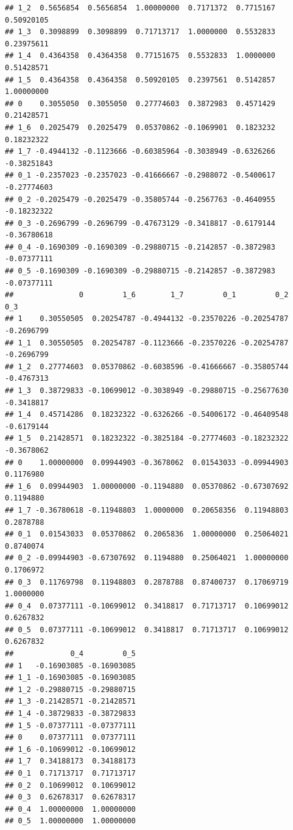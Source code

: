 \documentclass[12pt]{article}\usepackage[]{graphicx}\usepackage[]{color}
\makeatletter
\newenvironment{kframe}{%
 \def\at@end@of@kframe{}%
 \ifinner\ifhmode%
  \def\at@end@of@kframe{\end{minipage}}%
  \begin{minipage}{\columnwidth}%
 \fi\fi%
 \def\FrameCommand##1{\hskip\@totalleftmargin \hskip-\fboxsep
 \colorbox{shadecolor}{##1}\hskip-\fboxsep
     \hskip-\linewidth \hskip-\@totalleftmargin \hskip\columnwidth}%
 \MakeFramed {\advance\hsize-\width
   \@totalleftmargin\z@ \linewidth\hsize
   \@setminipage}}%
 {\par\unskip\endMakeFramed%
 \at@end@of@kframe}
\newenvironment{knitrout}{}{} %
\makeatother
\begin{document}
\begin{flushleft}
\begin{center}
\begin{knitrout}
\begin{kframe}
\begin{verbatim}
## 1_2  0.5656854  0.5656854  1.00000000  0.7171372  0.7715167  0.50920105
## 1_3  0.3098899  0.3098899  0.71713717  1.0000000  0.5532833  0.23975611
## 1_4  0.4364358  0.4364358  0.77151675  0.5532833  1.0000000  0.51428571
## 1_5  0.4364358  0.4364358  0.50920105  0.2397561  0.5142857  1.00000000
## 0    0.3055050  0.3055050  0.27774603  0.3872983  0.4571429  0.21428571
## 1_6  0.2025479  0.2025479  0.05370862 -0.1069901  0.1823232  0.18232322
## 1_7 -0.4944132 -0.1123666 -0.60385964 -0.3038949 -0.6326266 -0.38251843
## 0_1 -0.2357023 -0.2357023 -0.41666667 -0.2988072 -0.5400617 -0.27774603
## 0_2 -0.2025479 -0.2025479 -0.35805744 -0.2567763 -0.4640955 -0.18232322
## 0_3 -0.2696799 -0.2696799 -0.47673129 -0.3418817 -0.6179144 -0.36780618
## 0_4 -0.1690309 -0.1690309 -0.29880715 -0.2142857 -0.3872983 -0.07377111
## 0_5 -0.1690309 -0.1690309 -0.29880715 -0.2142857 -0.3872983 -0.07377111
##               0         1_6        1_7         0_1         0_2        0_3
## 1    0.30550505  0.20254787 -0.4944132 -0.23570226 -0.20254787 -0.2696799
## 1_1  0.30550505  0.20254787 -0.1123666 -0.23570226 -0.20254787 -0.2696799
## 1_2  0.27774603  0.05370862 -0.6038596 -0.41666667 -0.35805744 -0.4767313
## 1_3  0.38729833 -0.10699012 -0.3038949 -0.29880715 -0.25677630 -0.3418817
## 1_4  0.45714286  0.18232322 -0.6326266 -0.54006172 -0.46409548 -0.6179144
## 1_5  0.21428571  0.18232322 -0.3825184 -0.27774603 -0.18232322 -0.3678062
## 0    1.00000000  0.09944903 -0.3678062  0.01543033 -0.09944903  0.1176980
## 1_6  0.09944903  1.00000000 -0.1194880  0.05370862 -0.67307692  0.1194880
## 1_7 -0.36780618 -0.11948803  1.0000000  0.20658356  0.11948803  0.2878788
## 0_1  0.01543033  0.05370862  0.2065836  1.00000000  0.25064021  0.8740074
## 0_2 -0.09944903 -0.67307692  0.1194880  0.25064021  1.00000000  0.1706972
## 0_3  0.11769798  0.11948803  0.2878788  0.87400737  0.17069719  1.0000000
## 0_4  0.07377111 -0.10699012  0.3418817  0.71713717  0.10699012  0.6267832
## 0_5  0.07377111 -0.10699012  0.3418817  0.71713717  0.10699012  0.6267832
##             0_4         0_5
## 1   -0.16903085 -0.16903085
## 1_1 -0.16903085 -0.16903085
## 1_2 -0.29880715 -0.29880715
## 1_3 -0.21428571 -0.21428571
## 1_4 -0.38729833 -0.38729833
## 1_5 -0.07377111 -0.07377111
## 0    0.07377111  0.07377111
## 1_6 -0.10699012 -0.10699012
## 1_7  0.34188173  0.34188173
## 0_1  0.71713717  0.71713717
## 0_2  0.10699012  0.10699012
## 0_3  0.62678317  0.62678317
## 0_4  1.00000000  1.00000000
## 0_5  1.00000000  1.00000000
\end{verbatim}
\begin{alltt}

\end{alltt}
\end{kframe}
\end{knitrout}
\end{center}
\end{flushleft}
\end{document}
